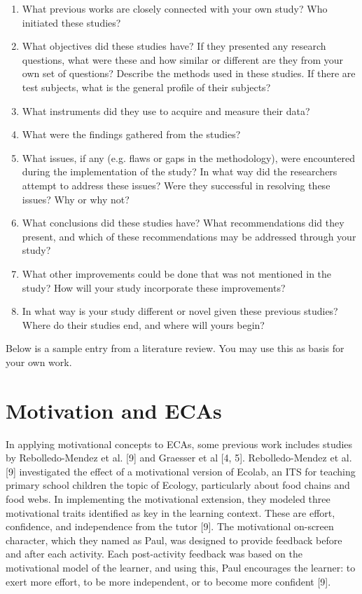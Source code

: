 \begin{enumerate}
\item What previous works are closely connected with your own study? Who initiated these studies?
\item What objectives did these studies have? If they presented any research questions, what were these and how similar or different are they from your own set of questions?
Describe the methods used in these studies.
If there are test subjects, what is the general profile of their subjects?
\item What instruments did they use to acquire and measure their data?
\item What were the findings gathered from the studies? 
\item What issues, if any (e.g. flaws or gaps in the methodology), were encountered during the implementation of the study? In what way did the researchers attempt to address these issues? Were they successful in resolving these issues? Why or why not?
\item What conclusions did these studies have? What recommendations did they present, and which of these recommendations may be addressed through your study?
\item What other improvements could be done that was not mentioned in the study? How will your study incorporate these improvements?
\item In what way is your study different or novel given these previous studies? Where do their studies end, and where will yours begin?
\end{enumerate}

Below is a sample entry from a literature review. You may use this as basis for your own work.

\section{Motivation and ECAs}
In applying motivational concepts to ECAs, some previous work includes studies by Rebolledo-Mendez et al. [9] and Graesser et al [4, 5].
Rebolledo-Mendez et al. [9] investigated the effect of a motivational version of Ecolab, an ITS for teaching primary school children the topic of Ecology, particularly about food chains and food webs. In implementing the motivational extension, they modeled three motivational traits identified as key in the learning context. These are effort, confidence, and independence from the tutor [9]. The motivational on-screen character, which they named as Paul, was designed to provide feedback before and after each activity. Each post-activity feedback was based on the motivational model of the learner, and using this, Paul encourages the learner: to exert more effort, to be more independent, or to become more confident [9].

